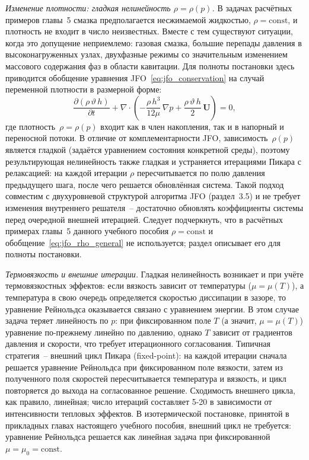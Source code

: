 \textit{Изменение плотности: гладкая нелинейность
$\rho = \rho(p)$.}
В задачах расчётных примеров главы~5 смазка предполагается несжимаемой
жидкостью, $\rho = \mathrm{const}$, и плотность не входит
в число неизвестных. Вместе с тем существуют ситуации, когда
это допущение неприемлемо: газовая смазка, большие перепады
давления в высоконагруженных узлах, двухфазные режимы
со значительным изменением массового содержания фаз в области
кавитации. Для полноты постановки здесь приводится обобщение
уравнения JFO~\eqref{eq:jfo_conservation} на случай переменной
плотности в размерной форме:
\begin{equation}
  \frac{\partial (\rho\,\vartheta\,h)}{\partial t}
  + \nabla\cdot\!\left(
      -\frac{\rho\,h^3}{12\mu}\,\nabla p
      + \frac{\rho\,\vartheta\,h}{2}\,\mathbf{U}
    \right) = 0,
  \label{eq:jfo_rho_general}
\end{equation}
где плотность~$\rho = \rho(p)$ входит как в член накопления,
так и в напорный и переносной потоки. В отличие от
комплементарности JFO, зависимость~$\rho(p)$ является гладкой
(задаётся уравнением состояния конкретной среды), поэтому результирующая нелинейность также гладкая
и устраняется итерациями Пикара с релаксацией: на каждой
итерации $\rho$ пересчитывается по полю давления предыдущего
шага, после чего решается обновлённая система. Такой подход
совместим с двухуровневой структурой алгоритма JFO
(раздел~3.5) и не требует изменения внутреннего
решателя~-- достаточно обновлять коэффициенты системы перед
очередной внешней итерацией. Следует подчеркнуть, что
в расчётных примерах главы~5 данного учебного пособия
$\rho = \mathrm{const}$
и обобщение~\eqref{eq:jfo_rho_general} не используется;
раздел описывает его для полноты постановки.

\textit{Термовязкость и внешние итерации.}
Гладкая нелинейность возникает и при учёте термовязкостных
эффектов: если вязкость зависит от температуры
($\mu = \mu(T)$), а температура в свою очередь определяется
скоростью диссипации в зазоре, то уравнение Рейнольдса
оказывается связано с уравнением энергии. В этом случае задача
теряет линейность по $p$: при фиксированном поле $T$ (а значит,
$\mu = \mu(T)$) уравнение по-прежнему линейно по давлению,
однако $T$ зависит от градиентов давления и скорости, что
требует итерационного согласования. Типичная стратегия~--
внешний цикл Пикара (fixed-point): на каждой итерации сначала
решается уравнение Рейнольдса при фиксированном поле вязкости,
затем из полученного поля скоростей пересчитывается температура
и вязкость, и цикл повторяется до выхода на согласованное
решение. Сходимость внешнего цикла, как правило, линейная;
число итераций составляет 5-20 в зависимости от интенсивности
тепловых эффектов. В изотермической постановке, принятой
в прикладных главах настоящего учебного пособия, внешний цикл
не требуется: уравнение Рейнольдса решается как линейная
задача при фиксированной $\mu = \mu_0 = \mathrm{const}$.

